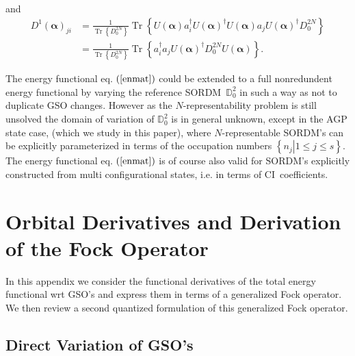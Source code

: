 \documentclass[aps,preprint]{revtex4}%
\begin{document}
and
\begin{align}
D^{1}\left(  \bm{\alpha}\right)  _{ji}  &  =\frac{1}{\operatorname{Tr}\left\{
D_{0}^{2N}\right\}  }\operatorname{Tr}\left\{  U\left(  \bm{\alpha}\right)
a_{i}^{\dagger}U\left(  \bm{\alpha}\right)  ^{\dagger}U\left(
\bm{\alpha}\right)  a_{j}U\left(  \bm{\alpha }\right)  ^{\dagger}D_{0}%
^{2N}\right\} \nonumber\\
&  =\frac{1}{\operatorname{Tr}\left\{  D_{0}^{2N}\right\}  }\operatorname{Tr}%
\left\{  a_{i}^{\dagger}a_{j}U\left(  \bm{\alpha}\right)  ^{\dagger}D_{0}%
^{2N}U\left(  \bm{\alpha}\right)  \right\}  .
\end{align}


The energy functional eq. $\left(  \ref{enmat}\right)  $ could be extended to
a full nonredundent energy functional by varying the reference
SORDM\ $\mathbb{D}_{0}^{2}$ in such a way as not to duplicate GSO changes.
However as the $N$-representability problem is still unsolved the domain of
variation of $\mathbb{D}_{0}^{2}$ is in general unknown, except in the AGP
state case, (which we study in this paper), where $N$-representable SORDM's
can be explicitly parameterized in terms of the occupation numbers $\left\{
\left.  n_{j}\right\vert 1\leq j\leq s\right\}  $. The energy functional eq.
$\left(  \ref{enmat}\right)  $ is of course also valid for SORDM's explicitly
constructed from multi configurational states, i.e. in terms of CI\ coefficients.

\section{Orbital Derivatives and Derivation of the Fock
Operator\label{Deriv_Fock}}

In this appendix we consider the functional derivatives of the total energy
functional wrt GSO's and express them in terms of a generalized Fock operator.
We then review a second quantized formulation of this generalized Fock operator.

\subsection{Direct Variation of GSO's}
\end{document}
